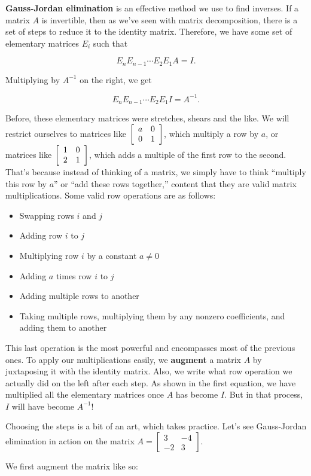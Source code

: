 \documentclass[../gatm.tex]{subfiles}
\begin{document}
\textbf{Gauss-Jordan elimination} is an effective method we use to find inverses. If a matrix $A$ is invertible, then as we've seen with matrix decomposition, there is a set of steps to reduce it to the identity matrix. Therefore, we have some set of elementary matrices $E_i$ such that

$$E_nE_{n-1}\cdots E_2E_1A=I.$$

Multiplying by $A^{-1}$ on the right, we get

$$E_nE_{n-1}\cdots E_2E_1I=A^{-1}.$$

Before, these elementary matrices were stretches, shears and the like. We will restrict ourselves to matrices like $\left[\begin{array}{cc} a & 0 \\ 0 & 1 \end{array}\right]$, which multiply a row by $a$, or matrices like $\left[\begin{array}{cc} 1 & 0 \\ 2 & 1 \end{array}\right]$, which adds a multiple of the first row to the second. That's because instead of thinking of a matrix, we simply have to think ``multiply this row by $a$'' or ``add these rows together,'' content that they are valid matrix multiplications. Some valid row operations are as follows:

\begin{itemize}
\item Swapping rows $i$ and $j$
\item Adding row $i$ to $j$
\item Multiplying row $i$ by a constant $a\neq 0$
\item Adding $a$ times row $i$ to $j$
\item Adding multiple rows to another
\item Taking multiple rows, multiplying them by any nonzero coefficients, and adding them to another
\end{itemize}

This last operation is the most powerful and encompasses most of the previous ones. To apply our multiplications easily, we \textbf{augment} a matrix $A$ by juxtaposing it with the identity matrix. Also, we write what row operation we actually did on the left after each step. As shown in the first equation, we have multiplied all the elementary matrices once $A$ has become $I$. But in that process, $I$ will have become $A^{-1}$!

Choosing the steps is a bit of an art, which takes practice. Let's see Gauss-Jordan elimination in action on the matrix $A=\left[\begin{smallmatrix}3 & -4 \\ -2 & 3\end{smallmatrix}\right]$.

We first augment the matrix like so:
\end{document}
